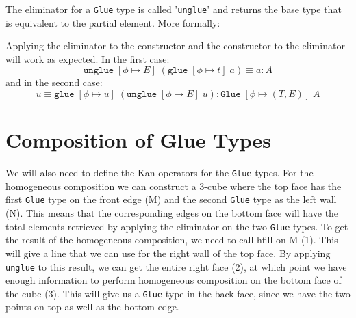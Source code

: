 \documentclass[11pt]{article}
\newcommand{\Glue}{\ensuremath{\texttt{Glue}}}
\newcommand{\glue}{\ensuremath{\texttt{glue}}}
\newcommand{\unglue}{\ensuremath{\texttt{unglue}}}
\newcommand{\hcomp}{\ensuremath{\textnormal{hcomp}}}
\newcommand{\hfilltt}{\ensuremath{\textnormal{hfill}}}
\begin{document}
The eliminator for a \texttt{Glue} type is called '\texttt{unglue}' and returns the base type that is equivalent to the partial element. More formally:
\begin{prooftree*}
	\hypo{u : \Glue \; [\phi \mapsto (T,E)] \; A}
	\infer1{\unglue \; [\phi \mapsto E] \; u : A \; [\phi \mapsto \text{fst} \; E \; u]}
\end{prooftree*}

Applying the eliminator to the constructor and the constructor to the eliminator will work as expected. In the first case: $$\unglue \; [\phi \mapsto E] \; (\glue \; [\phi \mapsto t] \; a) \equiv a : A$$ and in the second case: $$u \equiv \glue \; [\phi \mapsto u] \; (\unglue \; [\phi \mapsto E] \; u) : \Glue \; [\phi \mapsto (T, E)] \; A$$
\newpage

\section{Composition of Glue Types}
We will also need to define the Kan operators for the \texttt{Glue} types. For the homogeneous composition we can construct a 3-cube where the top face has the first \texttt{Glue} type on the front edge (M) and the second \texttt{Glue} type as the left wall (N). This means that the corresponding edges on the bottom face will have the total elements retrieved by applying the eliminator on the two \texttt{Glue} types. To get the result of the homogeneous composition, we need to call hfill on M (1). This will give a line that we can use for the right wall of the top face. By applying \texttt{unglue} to this result, we can get the entire right face (2), at which point we have enough information to perform homogeneous composition on the bottom face of the cube (3). This will give us a \texttt{Glue} type in the back face, since we have the two points on top as well as the bottom edge. 

\begin{center}
\end{center}
\end{document}
